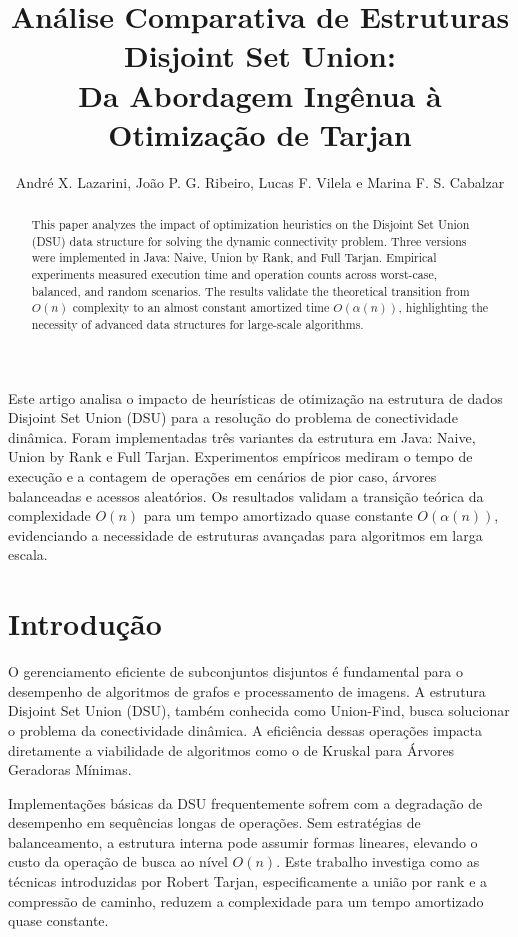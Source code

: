 \documentclass[12pt]{article}
\title{Análise Comparativa de Estruturas Disjoint Set Union: \\ Da Abordagem Ingênua à Otimização de Tarjan}
\author{André X. Lazarini, João P. G. Ribeiro, Lucas F. Vilela e Marina F. S. Cabalzar}
\begin{document}
 

\maketitle

\begin{abstract}
  This paper analyzes the impact of optimization heuristics on the Disjoint Set Union (DSU) data structure for solving the dynamic connectivity problem. Three versions were implemented in Java: Naive, Union by Rank, and Full Tarjan. Empirical experiments measured execution time and operation counts across worst-case, balanced, and random scenarios. The results validate the theoretical transition from $O(n)$ complexity to an almost constant amortized time $O(\alpha(n))$, highlighting the necessity of advanced data structures for large-scale algorithms.
\end{abstract}

\begin{resumo} 
  Este artigo analisa o impacto de heurísticas de otimização na estrutura de dados Disjoint Set Union (DSU) para a resolução do problema de conectividade dinâmica. Foram implementadas três variantes da estrutura em Java: Naive, Union by Rank e Full Tarjan. Experimentos empíricos mediram o tempo de execução e a contagem de operações em cenários de pior caso, árvores balanceadas e acessos aleatórios. Os resultados validam a transição teórica da complexidade $O(n)$ para um tempo amortizado quase constante $O(\alpha(n))$, evidenciando a necessidade de estruturas avançadas para algoritmos em larga escala.
\end{resumo}


\section{Introdução}

O gerenciamento eficiente de subconjuntos disjuntos é fundamental para o desempenho de algoritmos de grafos e processamento de imagens. A estrutura Disjoint Set Union (DSU), também conhecida como Union-Find, busca solucionar o problema da conectividade dinâmica. A eficiência dessas operações impacta diretamente a viabilidade de algoritmos como o de Kruskal para Árvores Geradoras Mínimas.

Implementações básicas da DSU frequentemente sofrem com a degradação de desempenho em sequências longas de operações. Sem estratégias de balanceamento, a estrutura interna pode assumir formas lineares, elevando o custo da operação de busca ao nível $O(n)$. Este trabalho investiga como as técnicas introduzidas por Robert Tarjan, especificamente a união por rank e a compressão de caminho, reduzem a complexidade para um tempo amortizado quase constante.
\end{document}
